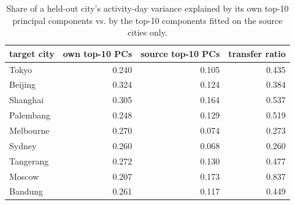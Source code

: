\begin{table}[t]
\centering\small
\caption{Share of a held-out city's activity-day variance explained by its own top-10 principal components vs. by the top-10 components fitted on the source cities only.}
\label{tab:A3_subspace_transfer}
\begin{tabular}{lrrr}
\toprule
target city & own top-10 PCs & source top-10 PCs & transfer ratio \\
\midrule
Tokyo & 0.240 & 0.105 & 0.435 \\
Beijing & 0.324 & 0.124 & 0.384 \\
Shanghai & 0.305 & 0.164 & 0.537 \\
Palembang & 0.248 & 0.129 & 0.519 \\
Melbourne & 0.270 & 0.074 & 0.273 \\
Sydney & 0.260 & 0.068 & 0.260 \\
Tangerang & 0.272 & 0.130 & 0.477 \\
Moscow & 0.207 & 0.173 & 0.837 \\
Bandung & 0.261 & 0.117 & 0.449 \\
\bottomrule
\end{tabular}
\end{table}
